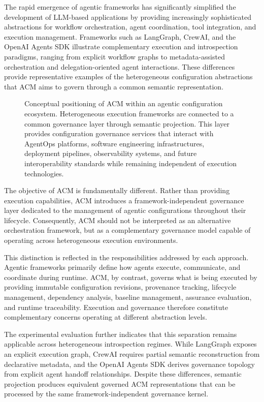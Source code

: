 \documentclass[10pt]{article}
\begin{document}
The rapid emergence of agentic frameworks has significantly simplified the development of LLM-based applications by providing increasingly sophisticated abstractions for workflow orchestration, agent coordination, tool integration, and execution management. Frameworks such as LangGraph, CrewAI, and the OpenAI Agents SDK illustrate complementary execution and introspection paradigms, ranging from explicit workflow graphs to metadata-assisted orchestration and delegation-oriented agent interactions. These differences provide representative examples of the heterogeneous configuration abstractions that ACM aims to govern through a common semantic representation.

\begin{figure}[t]
	\centering
	\caption{Conceptual positioning of ACM within an agentic configuration ecosystem. Heterogeneous execution frameworks are connected to a common governance layer through semantic projection. This layer provides configuration governance services that interact with AgentOps platforms, software engineering infrastructures, deployment pipelines, observability systems, and future interoperability standards while remaining independent of execution technologies.}
	\label{fig:agentic_configuration_ecosystem}
\end{figure}

The objective of ACM is fundamentally different. Rather than providing execution capabilities, ACM introduces a framework-independent governance layer dedicated to the management of agentic configurations throughout their lifecycle. Consequently, ACM should not be interpreted as an alternative orchestration framework, but as a complementary governance model capable of operating across heterogeneous execution environments.

This distinction is reflected in the responsibilities addressed by each approach. Agentic frameworks primarily define how agents execute, communicate, and coordinate during runtime. ACM, by contrast, governs what is being executed by providing immutable configuration revisions, provenance tracking, lifecycle management, dependency analysis, baseline management, assurance evaluation, and runtime traceability. Execution and governance therefore constitute complementary concerns operating at different abstraction levels.

The experimental evaluation further indicates that this separation remains applicable across heterogeneous introspection regimes. While LangGraph exposes an explicit execution graph, CrewAI requires partial semantic reconstruction from declarative metadata, and the OpenAI Agents SDK derives governance topology from explicit agent handoff relationships. Despite these differences, semantic projection produces equivalent governed ACM representations that can be processed by the same framework-independent governance kernel.
\end{document}
